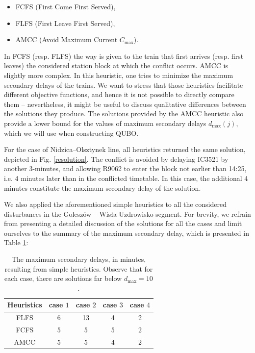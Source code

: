 \begin{itemize}
  \item FCFS (First Come First Served),
  \item FLFS (First Leave First Served),
  \item AMCC (Avoid Maximum Current $C_{\max}$).
\end{itemize}

In FCFS (resp. FLFS) the way is given to the train that first arrives (resp.
first leaves) the considered station block at which the conflict occurs. AMCC
\cite{mascis2002job} is slightly more complex. In this heuristic, one tries to
minimize the maximum secondary delays of the trains. We want to stress that
those heuristics facilitate different objective functions, and hence it is not
possible to directly compare them -- nevertheless, it might be useful to
discuss qualitative differences between the solutions they produce. The
solutions provided by the AMCC heuristic also provide a lower bound for the
values of maximum secondary delays $d_{\max}(j)$, which we will use when
constructing QUBO.

For the case of Nidzica--Olsztynek line, all heuristics returned the same
solution, depicted in Fig. \ref{resolution}. The conflict is avoided by
delaying IC3521 by another 3-minutes, and allowing R9062 to enter the block not
earlier than 14:25, i.e. 4 minutes later than in the conflicted timetable. In
this case, the additional 4 minutes constitute the maximum secondary delay of
the solution.

We also applied the aforementioned simple heuristics to all the considered
disturbances in the Goleszów -- Wisła Uzdrowisko segment. For brevity, we
refrain from presenting a detailed discussion of the solutions for all the
cases and limit ourselves to the summary of the maximum secondary delay, which
is presented in Table \ref{tab:simple}:

\begin{table}[bh]
  \centering
  \begin{tabular}{|c|c|c|c|c|}
    \hline
    \rowcolor{theader} Heuristics & case $1$ & case $2$ & case $3$ & case $4$ \\
    \hline
    FLFS                          & 6        & 13       & 4        & 2        \\
    \hline
    FCFS                          & 5        & 5        & 5        & 2        \\
    \hline
    AMCC                          & 5        & 5        & 4        & 2        \\
    \hline
  \end{tabular}
  \caption{The maximum secondary delays, in minutes, resulting from simple heuristics.
    Observe that for each case, there are solutions far below $d_{\text{max}} =
      10$.} \label{tab:simple}
\end{table}

